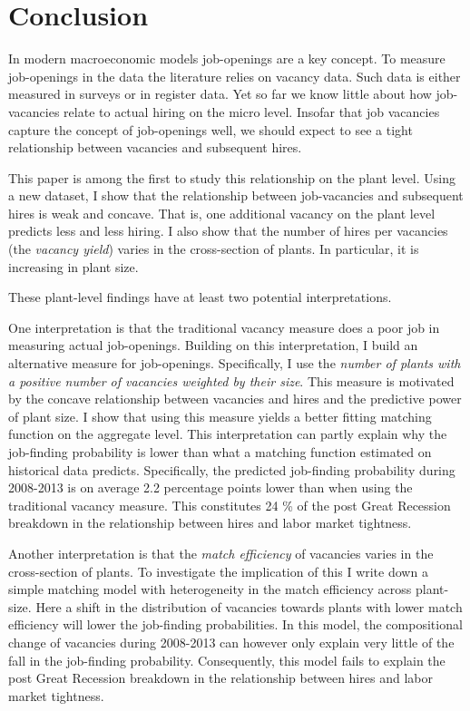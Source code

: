 \section{Conclusion}
\label{sec:conclusion}

In modern macroeconomic models job-openings are a key concept. To measure job-openings in the data the literature relies on vacancy data. Such data is either measured in surveys or in register data. Yet so far we know little about how job-vacancies relate to actual hiring on the micro level. Insofar that job vacancies capture the concept of job-openings well, we should expect to see a tight relationship between vacancies and subsequent hires.
 
This paper is among the first to study this relationship on the plant level. Using a new dataset, I show that the relationship between job-vacancies and subsequent hires is weak and concave. That is, one additional vacancy on the plant level predicts less and less hiring. I also show that the number of hires per vacancies (the \emph{vacancy yield}) varies in the cross-section of plants. In particular, it is increasing in plant size. %

These plant-level findings have at least two potential interpretations. 

One interpretation is that the traditional vacancy measure does a poor job in measuring actual job-openings. Building on this interpretation, I build an alternative measure for job-openings. Specifically, I use the \emph{number of plants with a positive number of vacancies weighted by their size}. This measure is motivated by the concave relationship between vacancies and hires and the predictive power of plant size. I show that using this measure yields a better fitting matching function on the aggregate level. This interpretation can partly explain why the job-finding probability is lower than what a matching function estimated on historical data predicts. Specifically, the predicted job-finding probability during 2008-2013 is on average 2.2 percentage points lower than when using the traditional vacancy measure. This constitutes 24 \% of the post Great Recession breakdown in the relationship between hires and labor market tightness. 

Another interpretation is that the \emph{match efficiency} of vacancies varies in the cross-section of plants. To investigate the implication of this I write down a simple matching model with heterogeneity in the match efficiency across plant-size. Here a shift in the distribution of vacancies towards plants with lower match efficiency will lower the job-finding probabilities. In this model, the compositional change of vacancies during 2008-2013 can however only explain very little of the fall in the job-finding probability. Consequently, this model fails to explain the post Great Recession breakdown in the relationship between hires and labor market tightness.

